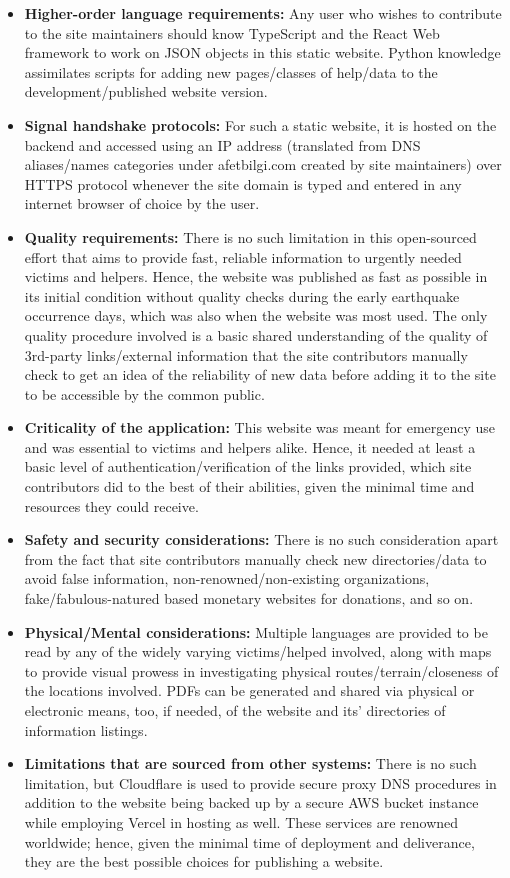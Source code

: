 \begin{itemize}
  \item \textbf{Higher-order language requirements:} Any user who wishes to contribute to the site maintainers should know TypeScript and the React Web framework to work on JSON objects in this static website. Python knowledge assimilates scripts for adding new pages/classes of help/data to the development/published website version.
  \item \textbf{Signal handshake protocols:} For such a static website, it is hosted on the backend and accessed using an IP address (translated from DNS aliases/names categories under afetbilgi.com created by site maintainers) over HTTPS protocol whenever the site domain is typed and entered in any internet browser of choice by the user.
  \item \textbf{Quality requirements:} There is no such limitation in this open-sourced effort that aims to provide fast, reliable information to urgently needed victims and helpers. Hence, the website was published as fast as possible in its initial condition without quality checks during the early earthquake occurrence days, which was also when the website was most used. The only quality procedure involved is a basic shared understanding of the quality of 3rd-party links/external information that the site contributors manually check to get an idea of the reliability of new data before adding it to the site to be accessible by the common public.
  \item \textbf{Criticality of the application:} This website was meant for emergency use and was essential to victims and helpers alike. Hence, it needed at least a basic level of authentication/verification of the links provided, which site contributors did to the best of their abilities, given the minimal time and resources they could receive.
  \item \textbf{Safety and security considerations:} There is no such consideration apart from the fact that site contributors manually check new directories/data to avoid false information, non-renowned/non-existing organizations, fake/fabulous-natured based monetary websites for donations, and so on.
  
  \vspace*{\fill}
  \newpage

  \item \textbf{Physical/Mental considerations:} Multiple languages are provided to be read by any of the widely varying victims/helped involved, along with maps to provide visual prowess in investigating physical routes/terrain/closeness of the locations involved. PDFs can be generated and shared via physical or electronic means, too, if needed, of the website and its' directories of information listings.
  \item \textbf{Limitations that are sourced from other systems:} There is no such limitation, but Cloudflare is used to provide secure proxy DNS procedures in addition to the website being backed up by a secure AWS bucket instance while employing Vercel in hosting as well. These services are renowned worldwide; hence, given the minimal time of deployment and deliverance, they are the best possible choices for publishing a website.
\end{itemize}

